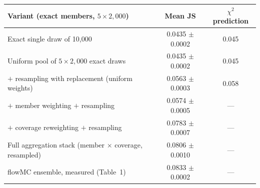 \begin{tabular}{lcc}
\toprule
Variant (exact members, $5\times2{,}000$) & Mean JS & $\chi^2$ prediction \\
\midrule
Exact single draw of 10{,}000 & 0.0435 $\pm$ 0.0002 & 0.045 \\
Uniform pool of $5\times2{,}000$ exact draws & 0.0435 $\pm$ 0.0002 & 0.045 \\
\quad $+$ resampling with replacement (uniform weights) & 0.0563 $\pm$ 0.0003 & 0.058 \\
\quad $+$ member weighting $+$ resampling & 0.0574 $\pm$ 0.0005 & --- \\
\quad $+$ coverage reweighting $+$ resampling & 0.0783 $\pm$ 0.0007 & --- \\
Full aggregation stack (member $\times$ coverage, resampled) & 0.0806 $\pm$ 0.0010 & --- \\
\midrule
flowMC ensemble, measured (Table~1) & 0.0833 $\pm$ 0.0002 & --- \\
\bottomrule
\end{tabular}
